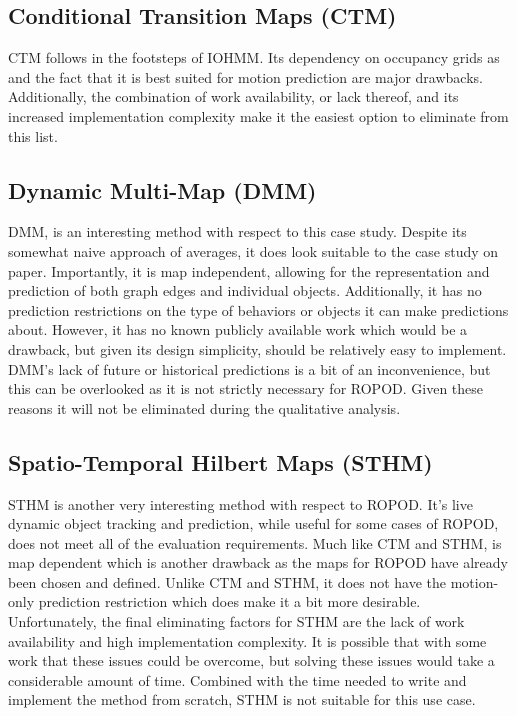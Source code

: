   \subsection { Conditional Transition Maps (CTM) }
  CTM follows in the footsteps of IOHMM. Its dependency on occupancy grids as
  and the fact that it is best suited for motion prediction are major drawbacks.
  Additionally, the combination of work availability, or lack thereof, and
  its increased implementation complexity make it the easiest option to
  eliminate from this list. \\

  \subsection { Dynamic Multi-Map (DMM) }
  DMM, is an interesting
  method with respect to this case study. Despite its somewhat naive approach
  of averages, it does look suitable to the case study on paper. Importantly, it is map
  independent, allowing for the representation and prediction of both graph edges and individual
  objects. Additionally, it has no prediction restrictions on the type of
  behaviors or objects it can make predictions about. However, it has no known publicly available
  work which would be a drawback, but given its design simplicity, should
  be relatively easy to implement. DMM's lack of future or historical
  predictions is a bit of an inconvenience, but this can be overlooked as it is not
  strictly necessary for ROPOD. Given these reasons it will not be eliminated
  during the qualitative analysis. \\

  \subsection{ Spatio-Temporal Hilbert Maps (STHM) }
  STHM is another very interesting method with respect to ROPOD.
  It's live dynamic object tracking and prediction, while useful for some
  cases of ROPOD, does not meet all of the evaluation requirements.
  Much like CTM and
  STHM, is map dependent which is another drawback as the maps for
  ROPOD have already been chosen and defined. Unlike CTM and STHM, it does not
  have the motion-only prediction restriction which does make it a bit more
  desirable. Unfortunately, the final eliminating factors for STHM are the lack
  of work availability and high implementation complexity. It is possible that with some
  work that these issues could be overcome, but solving these issues would take
  a considerable amount of time. Combined with the time needed to write
  and implement the method from scratch, STHM is not suitable for this
  use case. \\


